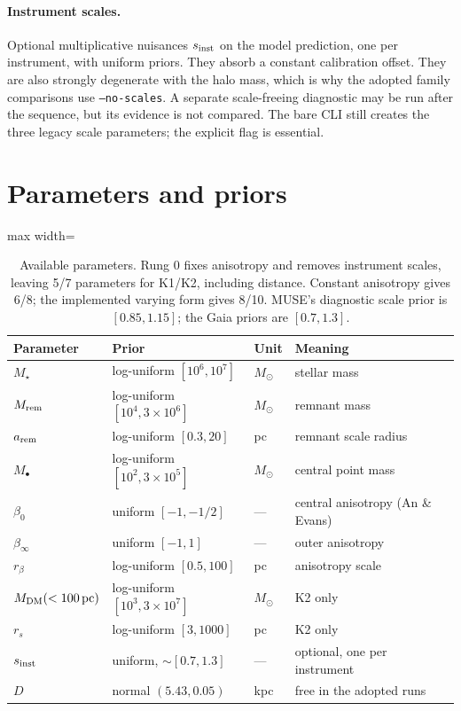 \documentclass[11pt,a4paper]{article}
\newcommand{\Msun}{M_\odot}
\begin{document}
\paragraph{Instrument scales.} Optional multiplicative nuisances $s_{\rm inst}$ on the model
prediction, one per instrument, with uniform priors. They absorb a constant calibration
offset. They are also strongly degenerate with the halo mass, which is why the adopted family comparisons use \texttt{--no-scales}. A separate scale-freeing diagnostic
may be run after the sequence, but its evidence is not compared. The bare CLI still
creates the three legacy scale parameters; the explicit flag is essential.

\section{Parameters and priors}

\begin{table}[h]
\centering\small
\begin{adjustbox}{max width=\linewidth}
\begin{tabular}{llll}
\toprule
Parameter & Prior & Unit & Meaning \\
\midrule
$M_\star$ & log-uniform $[10^6, 10^7]$ & $\Msun$ & stellar mass \\
$M_{\rm rem}$ & log-uniform $[10^4, 3\times10^6]$ & $\Msun$ & remnant mass \\
$a_{\rm rem}$ & log-uniform $[0.3, 20]$ & pc & remnant scale radius \\
$M_\bullet$ & log-uniform $[10^2, 3\times10^5]$ & $\Msun$ & central point mass \\
$\beta_0$ & uniform $[-1, -1/2]$ & --- & central anisotropy (An \& Evans) \\
$\beta_\infty$ & uniform $[-1, 1]$ & --- & outer anisotropy \\
$r_\beta$ & log-uniform $[0.5, 100]$ & pc & anisotropy scale \\
$M_{\rm DM}(<100\,\mathrm{pc})$ & log-uniform $[10^3, 3\times10^7]$ & $\Msun$ & K2 only \\
$r_s$ & log-uniform $[3, 1000]$ & pc & K2 only \\
$s_{\rm inst}$ & uniform, $\sim[0.7,1.3]$ & --- & optional, one per instrument \\
$D$ & normal $(5.43, 0.05)$ & kpc & free in the adopted runs \\
\bottomrule
\end{tabular}
\end{adjustbox}
\caption{Available parameters. Rung 0 fixes anisotropy and removes instrument scales,
leaving 5/7 parameters for K1/K2, including distance. Constant anisotropy gives 6/8;
the implemented varying form gives 8/10. MUSE's diagnostic scale prior is $[0.85,1.15]$;
the Gaia priors are $[0.7,1.3]$.}
\end{table}
\end{document}

